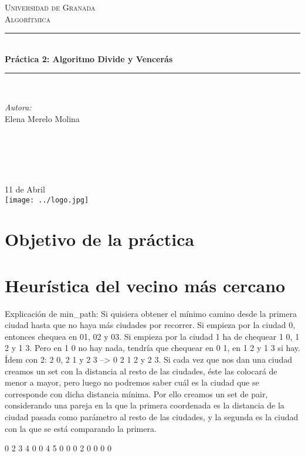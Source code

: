 \documentclass[12pt]{article}
\begin{document}
\begin{titlepage}
\newcommand{\HRule}{\rule{\linewidth}{0.5mm}}
\center
\textsc{\LARGE Universidad de Granada}\\[1.5cm] %
\textsc{\Large Algorítmica}\\[0.5cm] %
\HRule \\[0.4cm]
{ \huge \bfseries Práctica 2: Algoritmo Divide y Vencerás}\\[0.4cm] %
\HRule \\[1.5cm]
\begin{minipage}{0.4\textwidth}
\begin{flushleft} \large
\emph{Autora:}\\
Elena Merelo Molina \textsc{} %
\end{flushleft}
\end{minipage}
~
\begin{minipage}{0.4\textwidth}
\begin{flushright} \large
\emph{} \\
\textsc{} %
\end{flushright}
\end{minipage}\\[2cm]
{\large 11 de Abril}\\[2cm] %
\texttt{[image: ../logo.jpg]}
\vfill %
\end{titlepage}

%

\section{Objetivo de la práctica}


\section{Heurística del vecino más cercano}
Explicación de min_path: 
Si quisiera obtener el mínimo camino desde la primera ciudad hasta que no haya
más ciudades por recorrer. Si empieza por la ciudad 0, entonces chequea en 01, 02 y 03.
Si empieza por la ciudad 1 ha de chequear 1 0, 1 2 y 1 3. Pero en 1 0 no hay nada, tendría
que chequear en 0 1, en 1 2 y 1 3 si hay. Ídem con 2: 2 0, 2 1 y 2 3 --> 0 2 1 2 y 2 3.
Si cada vez que nos dan una ciudad creamos un set con la distancia al resto de las 
ciudades, éste las colocará de menor a mayor, pero luego no podremos saber cuál 
es la ciudad que se corresponde con dicha distancia mínima. Por ello creamos un set de pair, considerando una pareja en la que la primera coordenada es la distancia de la ciudad pasada como parámetro al resto de las ciudades, y la segunda es la ciudad con la que se está comparando la primera.

0 2 3 4
0 0 4 5
0 0 0 2
0 0 0 0
\end{document}
